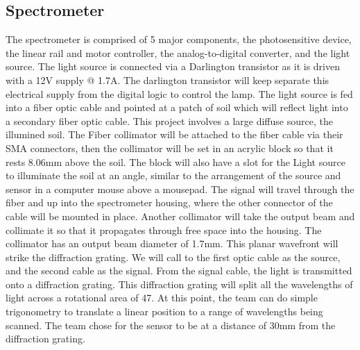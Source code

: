 \documentclass[journal]{IEEEtran}
\begin{document}
\subsection{Spectrometer}
The spectrometer is comprised of 5 major components, the photosensitive device, the linear rail and motor controller, the analog-to-digital converter, and the light source. The light source is connected via a Darlington transistor as it is driven with a 12V supply @ 1.7A. The darlington transistor will keep separate this electrical supply from the digital logic to control the lamp. The light source is fed into a fiber optic cable and pointed at a patch of soil which will reflect light into a secondary fiber optic cable.
This project involves a large diffuse source, the illumined soil. The Fiber collimator will be attached to the fiber cable via their SMA connectors, then the collimator will be set in an acrylic block so that it rests 8.06mm above the soil. The block will also have a slot for the Light source to illuminate the soil at an angle, similar to the arrangement of the source and sensor in a computer mouse above a mousepad.
The signal will travel through the fiber and up into the spectrometer housing, where the other connector of the cable will be mounted in place. Another collimator will take the output beam and collimate it so that it propagates through free space into the housing. The collimator has an output beam diameter of 1.7mm. This planar wavefront will strike the diffraction grating.
We will call to the first optic cable as the source, and the second cable as the signal. From the signal cable, the light is transmitted onto a diffraction grating. This diffraction grating will split all the wavelengths of light across a rotational area of 47\textdegree. At this point, the team can do simple trigonometry to translate a linear position to a range of wavelengths being scanned. The team chose for the sensor to be at a distance of 30mm from the diffraction grating. 
\end{document}
